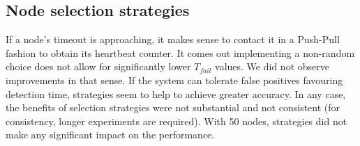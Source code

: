 \subsection*{Node selection strategies}

If a node's timeout is approaching, it makes sense to contact it in a Push-Pull fashion to obtain its heartbeat counter. 
It comes out implementing a non-random choice does not allow for significantly lower $T_{fail}$ values. We did not observe improvements in that sense.
If the system can tolerate false positives favouring detection time, strategies seem to help to achieve greater accuracy.
In any case, the benefits of selection strategies were not substantial and not consistent (for consistency, longer experiments are required).
With 50 nodes, strategies did not make any significant impact on the performance.

